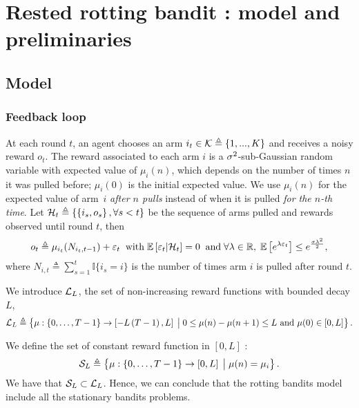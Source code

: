 

\section{Rested rotting bandit : model and preliminaries}
\label{Model}
\subsection{Model}
\subsubsection*{Feedback loop}
At each round $t$, an agent chooses an arm $i_t \in \mathcal{K} \triangleq \left\{ 1, ... , K\right\} $ and receives a noisy reward $o_t$. The reward associated to each arm $i$ is a $\sigma^2$-sub-Gaussian random variable with expected value of $\mu_i(n)$, which depends on the number of times $n$ it was pulled before; $\mu_i(0)$ is the initial expected value. %
We use $\mu_i(n)$ for the expected value of arm~$i$ \textit{after $n$ pulls} instead of when it is pulled \textit{for the $n$-th time}. 
Let $\mathcal{H}_t \triangleq \left\{ \left\{ i_s, o_s \right\}, \forall s < t \right\}$ be the sequence of arms pulled and rewards observed until round $t$, then 
%
\begin{equation}
\label{eq:rested-feedback}
o_{t} \triangleq \mu_{i_t}(N_{i_t,t-1}) + \varepsilon_t
 \;\; \text{with}\; \mathbb{E}\left[ \varepsilon_t | \mathcal{H}_t \right]= 0 \;\; \text{and} \; \forall \lambda \in \mathbb{R}, \; \mathbb{E}\left[ e^{\lambda\varepsilon_t}\right] \leq e^{\frac{\sigma\lambda^2}{2}},
\end{equation}
%
where $N_{i,t}\triangleq \sum_{s=1}^{t} \mathbb{I}\{i_s = i\}$ is the number of times arm $i$ is pulled after round $t$. %
%
\begin{definition}\label{def:rew-bounded-decay} 
We introduce $\mathcal{L}_L$, the set of non-increasing reward functions with bounded decay $L$,
\[ 
\mathcal{L}_L \triangleq \left\{ \mu : \left\{0, \dots, T-1 \right\} \rightarrow \left[- L\left(T -1\right),  L\right] \;\big{|}\; 0 \leq \mu(n) - \mu(n+1)  \leq L \text{ and } \mu(0) \in \left[0,  L\right] \right\}.
\]
\end{definition}

\begin{remark}
\label{rem:stationary-is-rotting}
We define the set of constant reward function in $\left[0, L\right]$ : 
\[ 
\mathcal{S}_L \triangleq \left\{ \mu : \left\{0, \dots, T-1 \right\} \rightarrow \left[0,  L\right] \;\big{|}\;  \mu(n) = \mu_i  \right\}.
\]
We have that $\mathcal{S}_L \subset \mathcal{L}_L$. Hence, we can conclude that the rotting bandits model include all the stationary bandits problems.
\end{remark}

